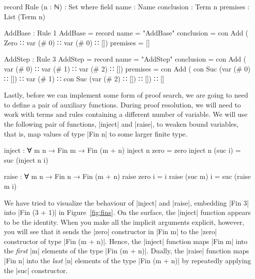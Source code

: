 \documentclass[preprint]{sigplanconf}
\begin{document}
\begin{code}
  record Rule (n : ℕ) : Set where
    field
      name        : Name
      conclusion  : Term n
      premises    : List (Term n)
\end{code}




\begin{code}
AddBase : Rule 1
AddBase = record {
  name        = "AddBase"
  conclusion  = con Add  (  Zero
                         ∷  var (# 0)
                         ∷  var (# 0)
                         ∷ [])
  premises    = []
  }
\end{code}

\begin{code}
AddStep : Rule 3
AddStep = record {
  name        = "AddStep"
  conclusion  =  con Add  (  var (# 0)
                          ∷  var (# 1)
                          ∷  var (# 2)
                          ∷ [])
  premises    =  con Add  (  con Suc (var (# 0) ∷ [])
                          ∷  var (# 1)
                          ∷  con Suc (var (# 2) ∷ [])
                          ∷ [])
                 ∷ []
  }
\end{code}

Lastly, before we can implement some form of proof search, we are
going to need to define a pair of auxiliary functions. During proof
resolution, we will need to work with terms and rules containing a
different number of variable. We will use the following pair of
functions, |inject| and |raise|, to weaken bound variables, that is,
map values of type |Fin n| to some larger finite type.
\begin{code}
  inject : ∀ {m} n → Fin m → Fin (m + n)
  inject n  zero    = zero
  inject n (suc i)  = suc (inject n i)

  raise : ∀ m {n} → Fin n → Fin (m + n)
  raise  zero   i  = i
  raise (suc m) i  = suc (raise m i)
\end{code}
We have tried to visualize the behaviour of |inject| and |raise|,
embedding |Fin 3| into |Fin (3 + 1)| in Figure~\ref{fig:fins}. On the
surface, the |inject| function appears to be the identity. When you
make all the implicit arguments explicit, however, you will see that
it sends the |zero| constructor in |Fin m| to the |zero| constructor
of type |Fin (m + n)|. Hence, the |inject| function maps |Fin m| into the
\emph{first} |m| elements of the type |Fin (m + n)|. Dually, the
|raise| function maps |Fin n| into the \emph{last} |n| elements of the
type |Fin (m + n)| by repeatedly applying the |suc| constructor.
\end{document}
